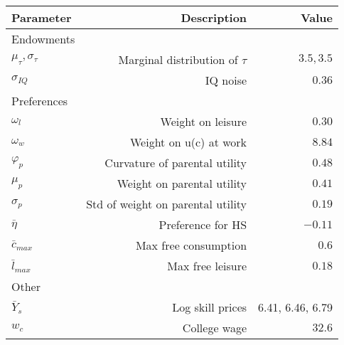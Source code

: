 \begin{tabular}{lrr}
\hline
Parameter & Description  & Value  \\ 
\hline
Endowments &   &   \\ 
$\mu_{\tau}, \sigma_{\tau}$ & Marginal distribution of $\tau$  & $3.5, 3.5$  \\ 
$\sigma_{IQ}$ & IQ noise  & $0.36$  \\ 
Preferences &   &   \\ 
$\omega_{l}$ & Weight on leisure  & $0.30$  \\ 
$\omega_{w}$ & Weight on u(c) at work  & $8.84$  \\ 
$\varphi_{p}$ & Curvature of parental utility  & $0.48$  \\ 
$\mu_{p}$ & Weight on parental utility  & $0.41$  \\ 
$\sigma_{p}$ & Std of weight on parental utility  & $0.19$  \\ 
$\bar{\eta}$ & Preference for HS  & $-0.11$  \\ 
$\bar{c}_{max}$ & Max free consumption  & $0.6$  \\ 
$\bar{l}_{max}$ & Max free leisure  & $0.18$  \\ 
Other &   &   \\ 
$\bar{Y}_{s}$ & Log skill prices  & 6.41, 6.46, 6.79  \\ 
$w_{c}$ & College wage  & $32.6$  \\ 
\hline
\end{tabular}%
